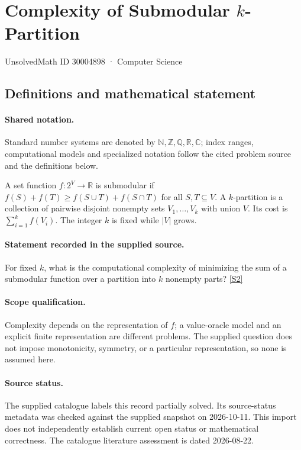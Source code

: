 \documentclass[11pt]{article}
\newcommand{\sref}[2]{\hyperlink{source:#1:#2}{[S#2]}}
\begin{document}
\setcounter{section}{30004897}
\section{Complexity of Submodular $k$-Partition}\label{30004898}
{\small\sffamily UnsolvedMath ID 30004898 · Computer Science}
\subsection{Definitions and mathematical statement}

\paragraph{Shared notation.}Standard number systems are denoted by $\mathbb N,\mathbb Z,\mathbb Q,\mathbb R,\mathbb C$; index ranges, computational models and specialized notation follow the cited problem source and the definitions below.


A set function $f:2^V\to\mathbb R$ is submodular if $f(S)+f(T)\geq f(S\cup T)+f(S\cap T)$ for all $S,T\subseteq V$. A $k$-partition is a collection of pairwise disjoint nonempty sets $V_1,\ldots,V_k$ with union $V$. Its cost is $\sum_{i=1}^kf(V_i)$. The integer $k$ is fixed while $|V|$ grows.
\paragraph{Statement recorded in the supplied source.}
For fixed $k$, what is the computational complexity of minimizing the sum of a submodular function over a partition into $k$ nonempty parts? \sref{30004898}{2}
\paragraph{Scope qualification.}
Complexity depends on the representation of $f$; a value-oracle model and an explicit finite representation are different problems. The supplied question does not impose monotonicity, symmetry, or a particular representation, so none is assumed here.
\paragraph{Source status.}
The supplied catalogue labels this record partially solved. Its source-status metadata was checked against the supplied snapshot on 2026-10-11. This import does not independently establish current open status or mathematical correctness. The catalogue literature assessment is dated 2026-08-22.
\end{document}
